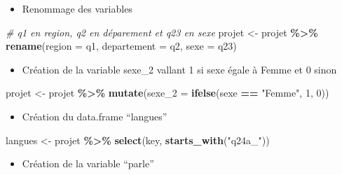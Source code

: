 \documentclass[
]{article}
\newenvironment{Shaded}{\begin{snugshade}}{\end{snugshade}}
\newcommand{\AttributeTok}[1]{\textcolor[rgb]{0.13,0.29,0.53}{#1}}
\newcommand{\CommentTok}[1]{\textcolor[rgb]{0.56,0.35,0.01}{\textit{#1}}}
\newcommand{\DecValTok}[1]{\textcolor[rgb]{0.00,0.00,0.81}{#1}}
\newcommand{\FunctionTok}[1]{\textcolor[rgb]{0.13,0.29,0.53}{\textbf{#1}}}
\newcommand{\NormalTok}[1]{#1}
\newcommand{\OtherTok}[1]{\textcolor[rgb]{0.56,0.35,0.01}{#1}}
\newcommand{\SpecialCharTok}[1]{\textcolor[rgb]{0.81,0.36,0.00}{\textbf{#1}}}
\newcommand{\StringTok}[1]{\textcolor[rgb]{0.31,0.60,0.02}{#1}}
\providecommand{\tightlist}{%
  \setlength{\itemsep}{0pt}\setlength{\parskip}{0pt}}
\begin{document}
\begin{itemize}
\tightlist
\item
  Renommage des variables
\end{itemize}

\begin{Shaded}
\begin{Highlighting}[]
\CommentTok{\# q1 en region, q2 en déparement et q23 en sexe}
\NormalTok{projet }\OtherTok{\textless{}{-}}\NormalTok{ projet }\SpecialCharTok{\%\textgreater{}\%}
  \FunctionTok{rename}\NormalTok{(}\AttributeTok{region =}\NormalTok{ q1, }\AttributeTok{departement =}\NormalTok{ q2, }\AttributeTok{sexe =}\NormalTok{ q23)}
\end{Highlighting}
\end{Shaded}

\begin{itemize}
\tightlist
\item
  Création de la variable sexe\_2 vallant 1 si sexe égale à Femme et 0
  sinon
\end{itemize}

\begin{Shaded}
\begin{Highlighting}[]
\NormalTok{projet }\OtherTok{\textless{}{-}}\NormalTok{ projet }\SpecialCharTok{\%\textgreater{}\%}
  \FunctionTok{mutate}\NormalTok{(}\AttributeTok{sexe\_2 =} \FunctionTok{ifelse}\NormalTok{(sexe }\SpecialCharTok{==} \StringTok{"Femme"}\NormalTok{, }\DecValTok{1}\NormalTok{, }\DecValTok{0}\NormalTok{))}
\end{Highlighting}
\end{Shaded}

\begin{itemize}
\tightlist
\item
  Création du data.frame ``langues''
\end{itemize}

\begin{Shaded}
\begin{Highlighting}[]
\NormalTok{langues }\OtherTok{\textless{}{-}}\NormalTok{ projet }\SpecialCharTok{\%\textgreater{}\%}
  \FunctionTok{select}\NormalTok{(key, }\FunctionTok{starts\_with}\NormalTok{(}\StringTok{"q24a\_"}\NormalTok{))}
\end{Highlighting}
\end{Shaded}

\begin{itemize}
\tightlist
\item
  Création de la variable ``parle''
\end{itemize}
\end{document}
